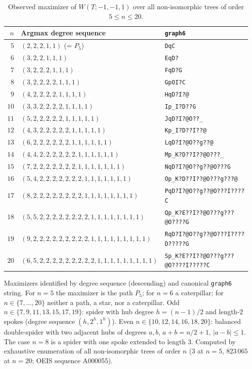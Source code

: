 \documentclass[a5paper, 10pt]{article}
\theoremstyle{plain}
\theoremstyle{remark}
\theoremstyle{definition}
\begin{document}
\begin{table}[H]
\centering
\small
\caption{Observed maximizer of $W(T; -1, -1, 1)$ over all non-isomorphic trees of order $5 \le n \le 20$.}
\label{tab:caterpillar_argmax}
\begin{tabular}{rll}
\toprule
$n$ & Argmax degree sequence & \mbox{\texttt{graph6}}\\
\midrule
$5$  & $(2, 2, 2, 1, 1)$ \quad (= $P_5$) & \mbox{\texttt{DqC}}\\
$6$  & $(3, 2, 2, 1, 1, 1)$ & \mbox{\texttt{EqD?}}\\
$7$  & $(3, 2, 2, 2, 1, 1, 1)$ & \mbox{\texttt{FqD?G}}\\
$8$  & $(3, 2, 2, 2, 2, 1, 1, 1)$ & \mbox{\texttt{GpOI?C}}\\
$9$  & $(4, 2, 2, 2, 2, 1, 1, 1, 1)$ & \mbox{\texttt{HqD?I?@}}\\
$10$ & $(3, 3, 2, 2, 2, 2, 1, 1, 1, 1)$ & \mbox{\texttt{Ip\_I?D??G}}\\
$11$ & $(5, 2, 2, 2, 2, 2, 1, 1, 1, 1, 1)$ & \mbox{\texttt{JqD?I?@O??\_}}\\
$12$ & $(4, 3, 2, 2, 2, 2, 2, 1, 1, 1, 1, 1)$ & \mbox{\texttt{Kp\_I?D??I??@}}\\
$13$ & $(6, 2, 2, 2, 2, 2, 2, 1, 1, 1, 1, 1, 1)$ & \mbox{\texttt{LqD?I?@O??g??@}}\\
$14$ & $(4, 4, 2, 2, 2, 2, 2, 2, 1, 1, 1, 1, 1, 1)$ & \mbox{\texttt{Mp\_K?D??I??@O???\_}}\\
$15$ & $(7, 2, 2, 2, 2, 2, 2, 2, 1, 1, 1, 1, 1, 1, 1)$ & \mbox{\texttt{NqD?I?@O??g??@O???G}}\\
$16$ & $(5, 4, 2, 2, 2, 2, 2, 2, 2, 1, 1, 1, 1, 1, 1, 1)$ & \mbox{\texttt{Op\_K?D??I??@O???g???@}}\\
$17$ & $(8, 2, 2, 2, 2, 2, 2, 2, 2, 1, 1, 1, 1, 1, 1, 1, 1)$ & \mbox{\texttt{PqD?I?@O??g??@O???I????C}}\\
$18$ & $(5, 5, 2, 2, 2, 2, 2, 2, 2, 2, 1, 1, 1, 1, 1, 1, 1, 1)$ & \mbox{\texttt{Qp\_K?E??I??@O???g???@O????G}}\\
$19$ & $(9, 2, 2, 2, 2, 2, 2, 2, 2, 2, 1, 1, 1, 1, 1, 1, 1, 1, 1)$ & \mbox{\texttt{RqD?I?@O??g??@O???I????D?????G}}\\
$20$ & $(6, 5, 2, 2, 2, 2, 2, 2, 2, 2, 2, 1, 1, 1, 1, 1, 1, 1, 1, 1)$ & \mbox{\texttt{Sp\_K?E??I??@O???g???@O????I?????C}}\\
\bottomrule
\end{tabular}

\vspace{0.4em}
\noindent\footnotesize{Maximizers identified by degree sequence (descending) and canonical \mbox{\texttt{graph6}} string. For $n = 5$ the maximizer is the path $P_5$; for $n = 6$ a caterpillar; for $n \in \{7, \ldots, 20\}$ neither a path, a star, nor a caterpillar. Odd $n \in \{7, 9, 11, 13, 15, 17, 19\}$: spider with hub degree $h = (n-1)/2$ and length-$2$ spokes (degree sequence $(h, 2^h, 1^h)$). Even $n \in \{10, 12, 14, 16, 18, 20\}$: balanced double-spider with two adjacent hubs of degrees $a, b$, $a + b = n/2 + 1$, $|a - b| \le 1$. The case $n = 8$ is a spider with one spoke extended to length $3$. Computed by exhaustive enumeration of all non-isomorphic trees of order $n$ ($3$ at $n = 5$, $823\,065$ at $n = 20$; OEIS sequence A000055).}
\end{table}
\end{document}
